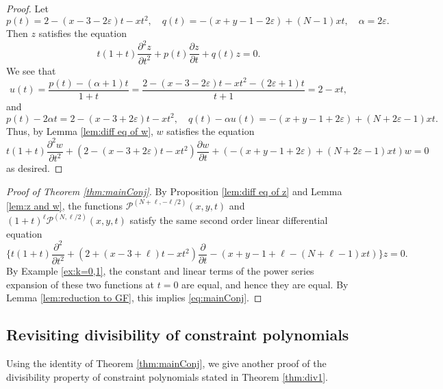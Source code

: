 \documentclass[11pt]{article}
\numberwithin{equation}{section}
\newcommand{\e}{\varepsilon}
\newcommand{\Gncp}[1]{\mathscr{P}^{(#1)}} %
\theoremstyle{plain}
\theoremstyle{definition}
\theoremstyle{remark}
\begin{document}
\begin{proof}
  Let
  \begin{equation*}
    p(t)=2-(x-3-2\e)t-xt^2, \quad
    q(t)=-(x+y-1-2\e)+(N-1)xt, \quad
    \alpha=2\e.
  \end{equation*}
  Then $z$ satisfies the equation
  \begin{equation*}
    t(1+t)\frac{\partial^2z}{\partial t^2}+p(t)\frac{\partial z}{\partial t}+q(t)z=0.
  \end{equation*}
  We see that
  \begin{equation*}
    u(t)=\frac{p(t)-(\alpha+1)t}{1+t}=\frac{2-(x-3-2\e)t-xt^2-(2\e+1)t}{t+1}=2-xt,
  \end{equation*}
  and
  \begin{equation*}
    p(t)-2\alpha t=2-(x-3+2\e)t-xt^2,\quad
    q(t)-\alpha u(t)=-(x+y-1+2\e)+(N+2\e-1)xt.
\end{equation*}
Thus, by Lemma \ref{lem:diff eq of w}, $w$ satisfies the equation
\begin{equation*}
  t(1+t)\frac{\partial^2w}{\partial t^2}+(2-(x-3+2\e)t-xt^2)\frac{\partial w}{\partial t}+(-(x+y-1+2\e)+(N+2\e-1)xt)w=0
\end{equation*}
as desired. 
\end{proof}

\begin{proof}[Proof of Theorem \ref{thm:mainConj}]
  By Proposition \ref{lem:diff eq of z} and Lemma \ref{lem:z and w}, the functions $\Gncp{N+\ell,-\ell/2}(x,y,t)$ and
  $(1+t)^\ell\Gncp{N,\ell/2}(x,y,t)$ satisfy the same second order linear differential equation
  \begin{equation*}
    \biggl\{t(1+t)\frac{\partial^2}{\partial t^2}
    +(2+(x-3+\ell)t-xt^2)\frac{\partial}{\partial t}
    -(x+y-1+\ell-(N+\ell-1)xt)\biggr\}
    z=0.
  \end{equation*}
  By Example \ref{ex:k=0,1}, the constant and linear terms of the power series expansion of these two
  functions at $t=0$ are equal, and hence they are equal. By Lemma \ref{lem:reduction to GF}, this implies \eqref{eq:mainConj}. 
\end{proof}

\subsection{Revisiting divisibility of constraint polynomials} \label{sec:revdiv}

Using the identity of Theorem \ref{thm:mainConj}, we give another proof of the divisibility property of
constraint polynomials stated in Theorem \ref{thm:div1}.
\end{document}
